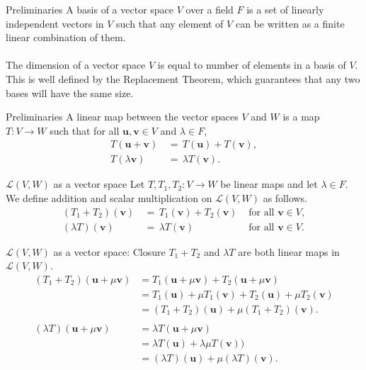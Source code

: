 \documentclass[handout]{beamer}
\def\u{\bm{u}}
\def\v{\bm{v}}
\def\L{\mathcal{L}}
\begin{document}
        \begin{frame}{Preliminaries}
                A basis of a vector space $V$ over a field $F$ is a set of linearly independent vectors in $V$ such that any element of $V$
                can be written as a finite linear combination of them. \\~\\

                The dimension of a vector space $V$ is equal to number of elements in a basis of $V$. This is well defined by the 
                Replacement Theorem, which guarantees that any two bases will have the same size.
        \end{frame}

        \begin{frame}{Preliminaries}
                A linear map between the vector spaces $V$ and $W$ is a map $T\colon V \to W$ such that for all $\u, \v \in V$ and $\lambda \in F$,
                \begin{align*}
                        T(\u + \v) \,&=\, T(\u) + T(\v), \\
                        T(\lambda \v) \,&=\, \lambda T(\v).
                \end{align*}
        \end{frame}

        \begin{frame}{$\L(V, W)$ as a vector space}
                Let $T, T_1, T_2\colon V \to W$ be linear maps and let $\lambda \in F$. We define addition and scalar multiplication 
                on $\L(V, W)$ as follows.
                \begin{align*}
                        (T_1 + T_2)(\v) \,&=\, T_1(\v) + T_2(\v) &\text{ for all } \v \in V, \\
                        (\lambda T)(\v) \,&=\, \lambda T(\v) &\text{ for all } \v \in V.
                \end{align*}
        \end{frame}

        \begin{frame}{$\L(V, W)$ as a vector space: Closure}
                $T_1 + T_2$ and $\lambda T$ are both linear maps in $\L(V, W)$.
                \begin{align*}
                        (T_1 + T_2)(\u + \mu\v) &= T_1(\u + \mu\v) + T_2(\u + \mu\v) \\
                                &= T_1(\u) + \mu T_1(\v) + T_2(\u) + \mu T_2(\v) \\
                                &= (T_1 + T_2)(\u) + \mu (T_1 + T_2)(\v). \\\\
                        (\lambda T)(\u + \mu \v) &= \lambda T(\u + \mu \v) \\
                                &= \lambda T(\u) + \lambda\mu T(\v)) \\
                                &= (\lambda T)(\u) + \mu (\lambda T)(\v).
                \end{align*}
        \end{frame}
\end{document}
